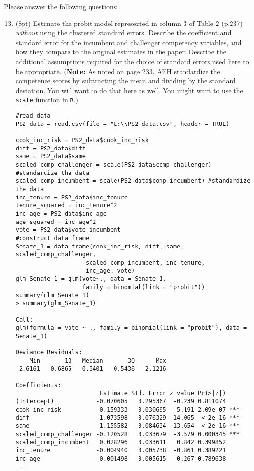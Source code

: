 \documentclass[11pt,english]{article}
\begin{document}
Please answer the following questions:
\begin{enumerate}
\setcounter{enumi}{12}
\item (8pt) Estimate the probit model represented in column 3 of Table 2
(p.237) \textit{without} using the clustered standard errors. Describe the coefficient and standard error for the incumbent and challenger competency variables, and how they compare to the original estimates in the paper. Describe the additional assumptions required for the choice of standard errors used here to be appropriate. (\textbf{Note:} As noted on page 233, AEH standardize the competence scores by subtracting the mean and
dividing by the standard deviation. You will want to do that here
as well. You might want to use the \texttt{scale} function in \texttt{R}.)

\begin{verbatim}
#read_data
PS2_data = read.csv(file = "E:\\PS2_data.csv", header = TRUE)

cook_inc_risk = PS2_data$cook_inc_risk
diff = PS2_data$diff
same = PS2_data$same
scaled_comp_challenger = scale(PS2_data$comp_challenger) #standardize the data
scaled_comp_incumbent = scale(PS2_data$comp_incumbent) #standardize the data
inc_tenure = PS2_data$inc_tenure
tenure_squared = inc_tenure^2
inc_age = PS2_data$inc_age
age_squared = inc_age^2
vote = PS2_data$vote_incumbent
#construct data frame
Senate_1 = data.frame(cook_inc_risk, diff, same, scaled_comp_challenger,
                    scaled_comp_incumbent, inc_tenure,
                    inc_age, vote)
glm_Senate_1 = glm(vote~., data = Senate_1,
                   family = binomial(link = "probit"))
summary(glm_Senate_1)
> summary(glm_Senate_1)

Call:
glm(formula = vote ~ ., family = binomial(link = "probit"), data = Senate_1)

Deviance Residuals:
    Min       1Q   Median       3Q      Max
-2.6161  -0.6865   0.3401   0.5436   2.1216

Coefficients:
                        Estimate Std. Error z value Pr(>|z|)
(Intercept)            -0.070605   0.295367  -0.239 0.811074
cook_inc_risk           0.159333   0.030695   5.191 2.09e-07 ***
diff                   -1.073598   0.076329 -14.065  < 2e-16 ***
same                    1.155582   0.084634  13.654  < 2e-16 ***
scaled_comp_challenger -0.120528   0.033679  -3.579 0.000345 ***
scaled_comp_incumbent   0.028296   0.033611   0.842 0.399852
inc_tenure             -0.004940   0.005738  -0.861 0.389221
inc_age                 0.001498   0.005615   0.267 0.789638
---


\end{verbatim}
\end{enumerate}
\end{document}
